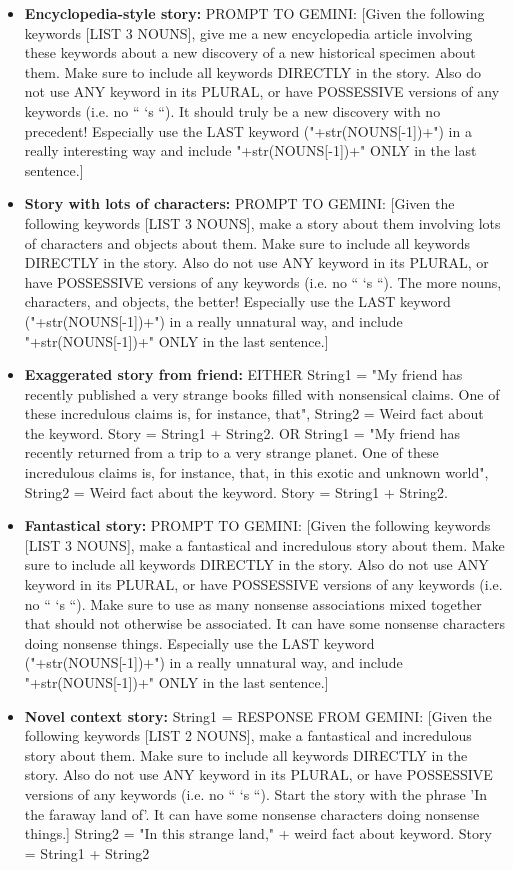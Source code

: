 \documentclass[11pt, a4paper, logo, copyright]{googledeepmind}
\theoremstyle{plain}
\theoremstyle{definition}
\theoremstyle{remark}
\begin{document}
\begin{itemize}[topsep=0pt,itemsep=1ex,partopsep=1ex,parsep=1ex]
\item \textbf{Encyclopedia-style story:} PROMPT TO GEMINI: [Given the following keywords [LIST 3 NOUNS], give me a new encyclopedia article involving these keywords about a new discovery of a new historical specimen about them. Make sure to include all keywords DIRECTLY in the story. Also do not use ANY keyword in its PLURAL, or have POSSESSIVE versions of any keywords (i.e. no “ ‘s “). It should truly be a new discovery with no precedent! Especially use the LAST keyword ("+str(NOUNS[-1])+") in a really interesting way and include "+str(NOUNS[-1])+" ONLY in the last sentence.]


\item \textbf{Story with lots of characters:} PROMPT TO GEMINI: [Given the following keywords [LIST 3 NOUNS], make a story about them involving lots of characters and objects about them. Make sure to include all keywords DIRECTLY in the story. Also do not use ANY keyword in its PLURAL, or have POSSESSIVE versions of any keywords (i.e. no “ ‘s “). The more nouns, characters, and objects, the better! Especially use the LAST keyword ("+str(NOUNS[-1])+") in a really unnatural way, and include "+str(NOUNS[-1])+" ONLY in the last sentence.]

\item \textbf{Exaggerated story from friend:} EITHER String1 = "My friend has recently published a very strange books filled with nonsensical claims. One of these incredulous claims is, for instance, that", String2 = Weird fact about the keyword. Story = String1 + String2. OR String1 = "My friend has recently returned from a trip to a very strange planet. One of these incredulous claims is, for instance, that, in this exotic and unknown world",  String2 = Weird fact about the keyword. Story = String1 + String2. 


\item \textbf{Fantastical story:} PROMPT TO GEMINI: [Given the following keywords [LIST 3 NOUNS], make a fantastical and incredulous story about them. Make sure to include all keywords DIRECTLY in the story. Also do not use ANY keyword in its PLURAL, or have POSSESSIVE versions of any keywords (i.e. no “ ‘s “). Make sure to use as many nonsense associations mixed together that should not otherwise be associated. It can have some nonsense characters doing nonsense things. Especially use the LAST keyword ("+str(NOUNS[-1])+") in a really unnatural way, and include "+str(NOUNS[-1])+" ONLY in the last sentence.]

\item \textbf{Novel context story:} String1 = RESPONSE FROM GEMINI: [Given the following keywords [LIST 2 NOUNS], make a fantastical and incredulous story about them. Make sure to include all keywords DIRECTLY in the story. Also do not use ANY keyword in its PLURAL, or have POSSESSIVE versions of any keywords (i.e. no “ ‘s “). Start the story with the phrase 'In the faraway land of'. It can have some nonsense characters doing nonsense things.] String2 = "In this strange land," + weird fact about keyword. Story = String1 + String2 




\end{itemize}
\end{document}
